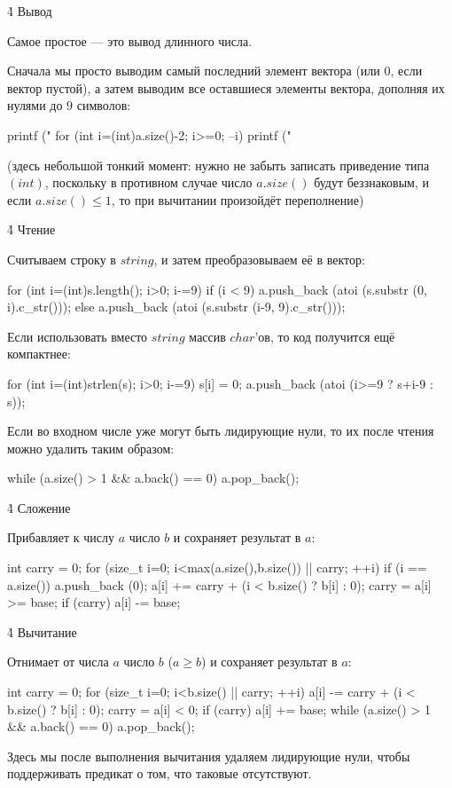 \h4{ Вывод }

Самое простое --- это вывод длинного числа.

Сначала мы просто выводим самый последний элемент вектора (или $0$, если вектор пустой), а затем выводим все оставшиеся элементы вектора, дополняя их нулями до $9$ символов:

\code
printf ("%
for (int i=(int)a.size()-2; i>=0; --i)
	printf ("%
\endcode

(здесь небольшой тонкий момент: нужно не забыть записать приведение типа $(int)$, поскольку в противном случае число $a.size()$ будут беззнаковым, и если $a.size() \le 1$, то при вычитании произойдёт переполнение)


\h4{ Чтение }

Считываем строку в $string$, и затем преобразовываем её в вектор:

\code
for (int i=(int)s.length(); i>0; i-=9)
	if (i < 9)
		a.push_back (atoi (s.substr (0, i).c_str()));
	else
		a.push_back (atoi (s.substr (i-9, 9).c_str()));
\endcode

Если использовать вместо $string$ массив $char$'ов, то код получится ещё компактнее:

\code
for (int i=(int)strlen(s); i>0; i-=9) {
	s[i] = 0;
	a.push_back (atoi (i>=9 ? s+i-9 : s));
}
\endcode

Если во входном числе уже могут быть лидирующие нули, то их после чтения можно удалить таким образом:

\code
while (a.size() > 1 && a.back() == 0)
	a.pop_back();
\endcode


\h4{ Сложение }

Прибавляет к числу $a$ число $b$ и сохраняет результат в $a$:

\code
int carry = 0;
for (size_t i=0; i<max(a.size(),b.size()) || carry; ++i) {
	if (i == a.size())
		a.push_back (0);
	a[i] += carry + (i < b.size() ? b[i] : 0);
	carry = a[i] >= base;
	if (carry)  a[i] -= base;
}
\endcode


\h4{ Вычитание }

Отнимает от числа $a$ число $b$ ($a \ge b$) и сохраняет результат в $a$:

\code
int carry = 0;
for (size_t i=0; i<b.size() || carry; ++i) {
	a[i] -= carry + (i < b.size() ? b[i] : 0);
	carry = a[i] < 0;
	if (carry)  a[i] += base;
}
while (a.size() > 1 && a.back() == 0)
	a.pop_back();
\endcode

Здесь мы после выполнения вычитания удаляем лидирующие нули, чтобы поддерживать предикат о том, что таковые отсутствуют.



